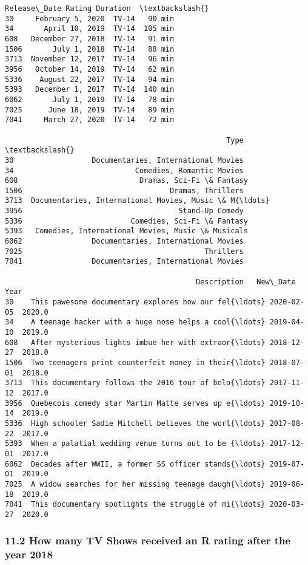 \documentclass[11pt]{article}
\begin{document}
\begin{tcolorbox}[breakable, size=fbox, boxrule=.5pt, pad at break*=1mm, opacityfill=0]
\begin{Verbatim}[commandchars=\\\{\}]
           Release\_Date Rating Duration  \textbackslash{}
30     February 5, 2020  TV-14   90 min
34       April 10, 2019  TV-14  105 min
608   December 27, 2018  TV-14   91 min
1506       July 1, 2018  TV-14   88 min
3713  November 12, 2017  TV-14   96 min
3956   October 14, 2019  TV-14   62 min
5336    August 22, 2017  TV-14   94 min
5393   December 1, 2017  TV-14  140 min
6062       July 1, 2019  TV-14   78 min
7025      June 18, 2019  TV-14   89 min
7041     March 27, 2020  TV-14   72 min

                                                   Type  \textbackslash{}
30                  Documentaries, International Movies
34                            Comedies, Romantic Movies
608                            Dramas, Sci-Fi \& Fantasy
1506                                  Dramas, Thrillers
3713  Documentaries, International Movies, Music \& M{\ldots}
3956                                    Stand-Up Comedy
5336                         Comedies, Sci-Fi \& Fantasy
5393   Comedies, International Movies, Music \& Musicals
6062                Documentaries, International Movies
7025                                          Thrillers
7041                Documentaries, International Movies

                                            Description   New\_Date    Year
30    This pawesome documentary explores how our fel{\ldots} 2020-02-05  2020.0
34    A teenage hacker with a huge nose helps a cool{\ldots} 2019-04-10  2019.0
608   After mysterious lights imbue her with extraor{\ldots} 2018-12-27  2018.0
1506  Two teenagers print counterfeit money in their{\ldots} 2018-07-01  2018.0
3713  This documentary follows the 2016 tour of belo{\ldots} 2017-11-12  2017.0
3956  Quebecois comedy star Martin Matte serves up e{\ldots} 2019-10-14  2019.0
5336  High schooler Sadie Mitchell believes the worl{\ldots} 2017-08-22  2017.0
5393  When a palatial wedding venue turns out to be {\ldots} 2017-12-01  2017.0
6062  Decades after WWII, a former SS officer stands{\ldots} 2019-07-01  2019.0
7025  A widow searches for her missing teenage daugh{\ldots} 2019-06-18  2019.0
7041  This documentary spotlights the struggle of mi{\ldots} 2020-03-27  2020.0
\end{Verbatim}
\end{tcolorbox}
        
    \hypertarget{how-many-tv-shows-received-an-r-rating-after-the-year-2018}{%
\subsubsection{11.2 How many TV Shows received an R rating after the
year
2018}\label{how-many-tv-shows-received-an-r-rating-after-the-year-2018}}
\end{document}
